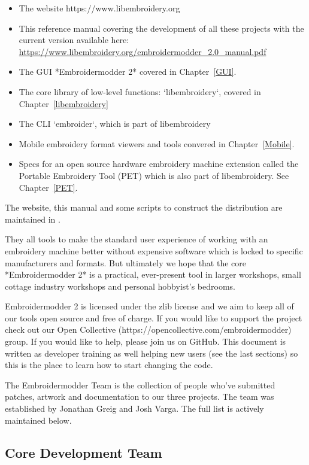 \documentclass[a4paper]{report}
\begin{document}
\begin{itemize}
\item The website https://www.libembroidery.org
\item This reference manual covering the development of all these projects with
the current version available here:
\url{https://www.libembroidery.org/embroidermodder_2.0_manual.pdf}
\item The GUI *Embroidermodder 2* covered in Chapter~\ref{GUI}.
\item The core library of low-level functions: `libembroidery`, covered in
Chapter~\ref{libembroidery}
\item The CLI `embroider`, which is part of libembroidery
\item Mobile embroidery format viewers and tools convered in Chapter~\ref{Mobile}.
\item Specs for an open source hardware embroidery machine extension called the
Portable Embroidery Tool (PET) which is also part of libembroidery.
See Chapter~\ref{PET}.
\end{itemize}

The website, this manual and some scripts to construct the distribution are
maintained in \citep{embroidermodder_website}.

They all tools to make the standard
user experience of working with an embroidery machine better without expensive
software which is locked to specific manufacturers and formats. But ultimately
we hope that the core *Embroidermodder 2* is a practical, ever-present tool in
larger workshops, small cottage industry workshops and personal hobbyist's
bedrooms.

Embroidermodder 2 is licensed under the zlib license and we aim to keep all of our tools open
source and free of charge. If you would like to support the project check out our  Open
Collective (https://opencollective.com/embroidermodder) group.
If you would like to help,
please join us on GitHub. This document is written as developer training as well helping new
users (see the last sections) so this is the place to learn how to start changing the code.

The Embroidermodder Team is the collection of people who've submitted
patches, artwork and documentation to our three projects.
The team was established by Jonathan Greig and Josh Varga.
The full list is actively maintained below.

\subsection{Core Development Team}
\end{document}
